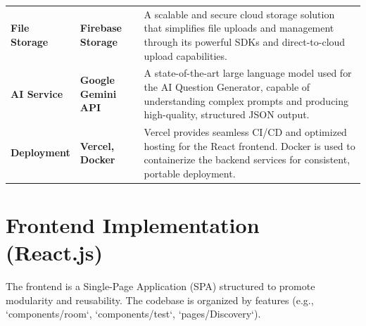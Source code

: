 \begin{longtable}{
>{\raggedright\arraybackslash}p{2.8cm} 
>{\centering\arraybackslash}p{3.2cm} 
>{\raggedright\arraybackslash}p{8cm}}
\textbf{File Storage} & \textbf{Firebase Storage} &
A scalable and secure cloud storage solution that simplifies file uploads and management through its powerful SDKs and direct-to-cloud upload capabilities. \\[0.5em]

\textbf{AI Service} & \textbf{Google Gemini API} &
A state-of-the-art large language model used for the AI Question Generator, capable of understanding complex prompts and producing high-quality, structured JSON output. \\[0.5em]

\textbf{Deployment} & \textbf{Vercel, Docker} &
Vercel provides seamless CI/CD and optimized hosting for the React frontend.
Docker is used to containerize the backend services for consistent, portable deployment. \\[0.5em]

\end{longtable}



\section{Frontend Implementation (React.js)}
\label{sec:impl-frontend}
The frontend is a Single-Page Application (SPA) structured to promote modularity and reusability. The codebase is organized by features (e.g., `components/room`, `components/test`, `pages/Discovery`).

